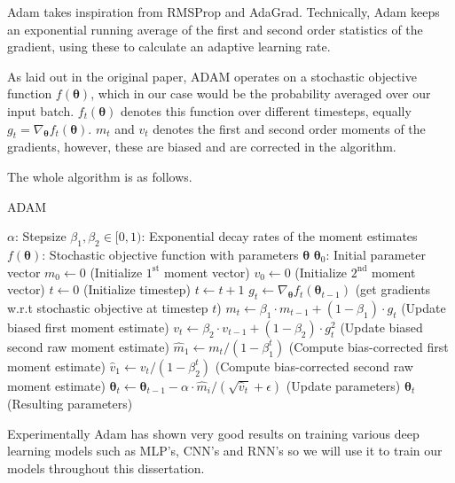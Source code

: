Adam takes inspiration from RMSProp and AdaGrad. Technically, Adam keeps an
exponential running average of the first and second order statistics of the
gradient, using these to calculate an adaptive learning rate.

As laid out in the original paper, ADAM operates on a stochastic objective
function $f(\bm{\theta})$, which in our case would be the probability averaged
over our input batch. $f_t(\bm{\theta})$ denotes this function over different
timesteps, equally $g_t = \nabla_{\bm{\theta}} f_t(\bm{\theta})$. $m_t$ and
$v_t$ denotes the first and second order moments of the gradients, however,
these are biased and are corrected in the algorithm.

The whole algorithm is as follows.

\begin{algorithm}
  \caption{ADAM}\label{ADAM}
  \begin{algorithmic}[1]
    \Require $\alpha$: Stepsize
    \Require $\beta_1, \beta_2 \in [0, 1)$: Exponential decay rates of the moment estimates
    \Require $f(\bm{\theta})$: Stochastic objective function with parameters
    $\bm{\theta}$
    \Require $\bm{\theta}_0$: Initial parameter vector
    \State $m_0 \gets 0$ (Initialize $1^{\text{st}}$ moment vector)
    \State $v_0 \gets 0$ (Initialize $2^{\text{nd}}$ moment vector)
    \State $t \gets 0$ (Initialize timestep)
    \State $t \gets t + 1$
    \State $g_t \gets \nabla_{\bm{\theta}}f_t(\bm{\theta}_{t-1})$ (get gradients w.r.t stochastic objective at timestep $t$)
    \State $m_t \gets \beta_1 \cdot m_{t-1} + (1 - \beta_1) \cdot g_t$ (Update biased first moment estimate)
    \State $v_t \gets \beta_2 \cdot v_{t-1} + (1 - \beta_2) \cdot g^2_t$ (Update biased second raw moment estimate)
    \State $\hat{m}_1 \gets m_t / (1 - \beta^t_1)$ (Compute bias-corrected first moment estimate)
    \State $\hat{v}_1 \gets v_t / (1 - \beta^t_2)$ (Compute bias-corrected second raw moment estimate)
    \State $\bm{\theta}_t \gets \bm{\theta}_{t-1} - \alpha \cdot \hat{m}_i/(\sqrt{\hat{v}_t} + \epsilon)$ (Update parameters)
    \EndWhile
    \Return $\bm{\theta}_t$ (Resulting parameters)
  \end{algorithmic}
\end{algorithm}

Experimentally Adam has shown very good results on training various deep
learning models such as MLP's, CNN's and RNN's so we will use it to train our
models throughout this dissertation\cite{kingma_adam:_2014}.